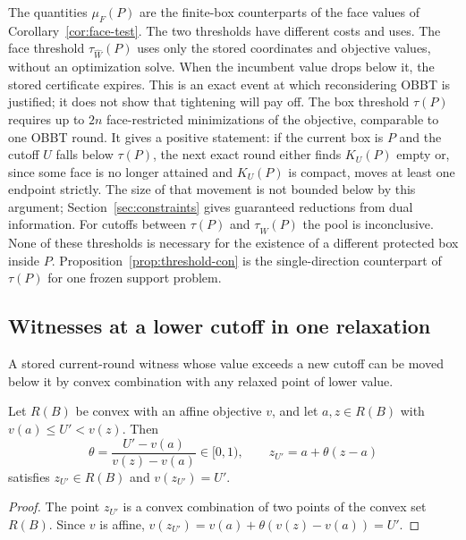 The quantities $\mu_F(P)$ are the finite-box counterparts of the face
values of Corollary~\ref{cor:face-test}. The two thresholds have
different costs and uses. The face threshold $\tau_{\widehat W}(P)$ uses
only the stored coordinates and objective values, without an optimization
solve. When the incumbent value drops below it, the stored certificate
expires. This is an exact event at which reconsidering OBBT is justified;
it does not show that tightening will pay off. The box threshold
$\tau(P)$ requires up to $2n$ face-restricted minimizations of the
objective, comparable to one OBBT round. It gives a positive statement:
if the current box is $P$ and the cutoff $U$ falls below $\tau(P)$, the
next exact round either finds $K_U(P)$ empty or, since some face is no
longer attained and $K_U(P)$ is compact, moves at least one endpoint
strictly. The size of that movement is not bounded below by this
argument; Section~\ref{sec:constraints} gives guaranteed reductions from
dual information. For cutoffs between $\tau(P)$ and
$\tau_{\widehat W}(P)$ the pool is inconclusive. None of these thresholds
is necessary for the existence of a different protected box inside $P$.
Proposition~\ref{prop:threshold-con} is the single-direction counterpart
of $\tau(P)$ for one frozen support problem.

\subsection{Witnesses at a lower cutoff in one relaxation}\label{sec:cutoff-mixing}

A stored current-round witness whose value exceeds a new cutoff can be
moved below it by convex combination with any relaxed point of lower
value.

\begin{proposition}\label{prop:mixing}
Let $R(B)$ be convex with an affine objective $v$, and let $a,z\in R(B)$
with $v(a)\le U'<v(z)$. Then
\begin{equation}\label{eq:mixing}
 \theta=\frac{U'-v(a)}{v(z)-v(a)}\in[0,1),\qquad
 z_{U'}=a+\theta(z-a)
\end{equation}
satisfies $z_{U'}\in R(B)$ and $v(z_{U'})=U'$.
\end{proposition}
\begin{proof}
The point $z_{U'}$ is a convex combination of two points of the convex
set $R(B)$. Since $v$ is affine,
$v(z_{U'})=v(a)+\theta(v(z)-v(a))=U'$.
\end{proof}

